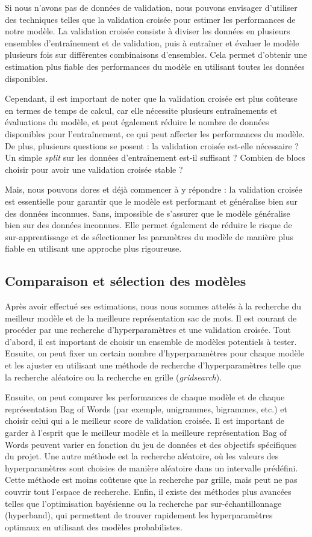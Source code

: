 \documentclass{article}
\begin{document}
Si nous n'avons pas de données de validation, nous pouvons envisager d'utiliser des techniques telles que la validation croisée pour estimer les performances de notre modèle. La validation croisée consiste à diviser les données en plusieurs ensembles d'entraînement et de validation, puis à entraîner et évaluer le modèle plusieurs fois sur différentes combinaisons d'ensembles. Cela permet d'obtenir une estimation plus fiable des performances du modèle en utilisant toutes les données disponibles.

Cependant, il est important de noter que la validation croisée est plus coûteuse en termes de temps de calcul, car elle nécessite plusieurs entraînements et évaluations du modèle, et peut également réduire le nombre de données disponibles pour l'entraînement, ce qui peut affecter les performances du modèle. De plus, plusieurs questions se posent : la validation croisée est-elle nécessaire ? Un simple \textit{split} sur les données d'entraînement est-il suffisant ? Combien de blocs choisir pour avoir une validation croisée stable ? 

Mais, nous pouvons dores et déjà commencer à y répondre :  la validation croisée est essentielle pour garantir que le modèle est performant et généralise bien sur des données inconnues. Sans, impossible de s'assurer que le modèle généralise bien sur des données inconnues. Elle permet également de réduire le risque de sur-apprentissage et de sélectionner les paramètres du modèle de manière plus fiable en utilisant une approche plus rigoureuse.

\subsection{Comparaison et sélection des modèles}

Après avoir effectué ses estimations, nous nous sommes attelés à la recherche du meilleur modèle et de la meilleure représentation sac de mots. Il est courant de procéder par une recherche d'hyperparamètres et une validation croisée. Tout d'abord, il est important de choisir un ensemble de modèles potentiels à tester. Ensuite, on peut fixer un certain nombre d'hyperparamètres pour chaque modèle et les ajuster en utilisant une méthode de recherche d'hyperparamètres telle que la recherche aléatoire ou la recherche en grille (\textit{gridsearch}). 

Ensuite, on peut comparer les performances de chaque modèle et de chaque représentation Bag of Words (par exemple, unigrammes, bigrammes, etc.) et choisir celui qui a le meilleur score de validation croisée. Il est important de garder à l'esprit que le meilleur modèle et la meilleure représentation Bag of Words peuvent varier en fonction du jeu de données et des objectifs spécifiques du projet. Une autre méthode est la recherche aléatoire, où les valeurs des hyperparamètres sont choisies de manière aléatoire dans un intervalle prédéfini. Cette méthode est moins coûteuse que la recherche par grille, mais peut ne pas couvrir tout l'espace de recherche. Enfin, il existe des méthodes plus avancées telles que l'optimisation bayésienne ou la recherche par sur-échantillonnage (hyperband), qui permettent de trouver rapidement les hyperparamètres optimaux en utilisant des modèles probabilistes.
\end{document}
